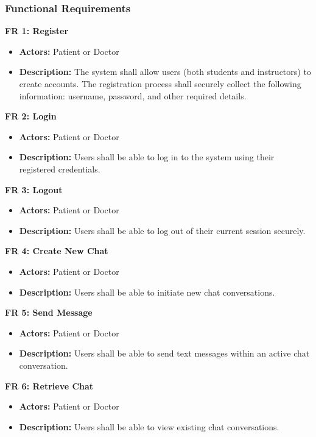 \subsubsection{Functional Requirements}
\textbf{FR 1: Register}
\begin{itemize}
    \item \textbf{Actors:} Patient or Doctor
    \item \textbf{Description:} The system shall allow users (both students and instructors) to create accounts. The registration process shall securely collect the following information: username, password, and other required details. 
\end{itemize} 

\textbf{FR 2: Login} 
\begin{itemize}
    \item \textbf{Actors:} Patient or Doctor
    \item \textbf{Description:} Users shall be able to log in to the system using their registered credentials.
\end{itemize}

\textbf{FR 3: Logout} 
\begin{itemize}
    \item \textbf{Actors:} Patient or Doctor
    \item \textbf{Description:} Users shall be able to log out of their current session securely.
\end{itemize}

\textbf{FR 4: Create New Chat}
\begin{itemize}
    \item \textbf{Actors:} Patient or Doctor
    \item \textbf{Description:} Users shall be able to initiate new chat conversations.
\end{itemize}

\textbf{FR 5: Send Message}  
\begin{itemize}
    \item \textbf{Actors:} Patient or Doctor
    \item \textbf{Description:} Users shall be able to send text messages within an active chat conversation.
\end{itemize}

\textbf{FR 6: Retrieve Chat} 
\begin{itemize}
    \item \textbf{Actors:} Patient or Doctor
    \item \textbf{Description:} Users shall be able to view existing chat conversations. 
\end{itemize}


